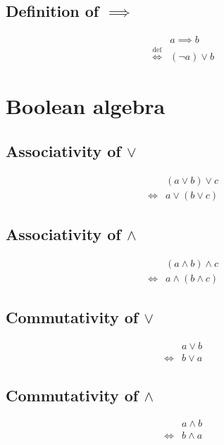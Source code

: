 \subsection{Definition of $\implies$}
\begin{defn}
\label{Definition:implies}
\begin{align*}
& a \implies b \\
\overset{\operatorname{def}}{\iff} & (\lnot a) \lor b
\end{align*}
\end{defn}

\section{Boolean algebra}
\subsection{Associativity of $\lor$}
\begin{prop}
\label{Proposition:lor_associativity}
\begin{align*}
& (a \lor b) \lor c \\
\iff & a \lor (b \lor c)
\end{align*}
\end{prop}

\subsection{Associativity of $\land$}
\begin{prop}
\label{Proposition:land_associativity}
\begin{align*}
& (a \land b) \land c \\
\iff & a \land (b \land c)
\end{align*}
\end{prop}

\subsection{Commutativity of $\lor$}
\begin{prop}
\label{Proposition:lor_commutativity}
\begin{align*}
& a \lor b \\
\iff & b \lor a
\end{align*}
\end{prop}

\subsection{Commutativity of $\land$}
\begin{prop}
\label{Proposition:land_commutativity}
\begin{align*}
& a \land b \\
\iff & b \land a
\end{align*}
\end{prop}

